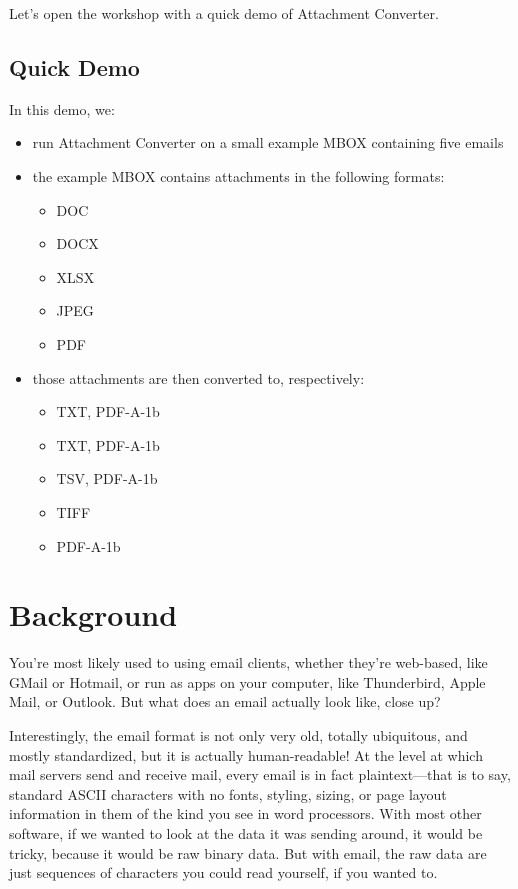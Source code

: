 \documentclass[11pt]{article}
\begin{document}
Let's open the workshop with a quick demo of Attachment Converter.

\subsection{Quick Demo}
\label{sec:orgb5bf045}

In this demo, we:

\begin{itemize}
\item run Attachment Converter on a small example MBOX containing five
emails
\item the example MBOX contains attachments in the following formats:
\begin{itemize}
\item DOC
\item DOCX
\item XLSX
\item JPEG
\item PDF
\end{itemize}
\item those attachments are then converted to, respectively:
\begin{itemize}
\item TXT, PDF-A-1b
\item TXT, PDF-A-1b
\item TSV, PDF-A-1b
\item TIFF
\item PDF-A-1b
\end{itemize}
\end{itemize}

\section{Background}
\label{sec:org0d8fd9c}

You're most likely used to using email clients, whether they're
web-based, like GMail or Hotmail, or run as apps on your computer,
like Thunderbird, Apple Mail, or Outlook.  But what does an email
actually look like, close up?

Interestingly, the email format is not only very old, totally
ubiquitous, and mostly standardized, but it is actually
human-readable!  At the level at which mail servers send and receive
mail, every email is in fact plaintext---that is to say, standard
ASCII characters with no fonts, styling, sizing, or page layout
information in them of the kind you see in word processors.  With most
other software, if we wanted to look at the data it was sending
around, it would be tricky, because it would be raw binary data.  But
with email, the raw data are just sequences of characters you could
read yourself, if you wanted to.
\end{document}
